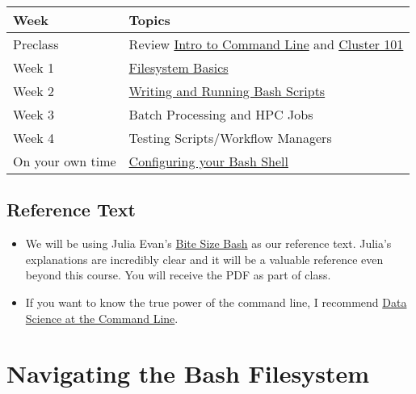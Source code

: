 \documentclass[
  letterpaper,
  DIV=11,
  numbers=noendperiod]{scrreprt}
\providecommand{\tightlist}{%
  \setlength{\itemsep}{0pt}\setlength{\parskip}{0pt}}
\begin{document}

\begin{longtable}[]{@{}
  >{\raggedright\arraybackslash}p{}
  >{\raggedright\arraybackslash}p{}@{}}
\toprule\noalign{}
\begin{minipage}[b]{\linewidth}\raggedright
Week
\end{minipage} & \begin{minipage}[b]{\linewidth}\raggedright
Topics
\end{minipage} \\
\midrule\noalign{}
\endhead
\bottomrule\noalign{}
\endlastfoot
Preclass & Review
\href{https://hutchdatascience.org/Intro_to_Command_Line/}{Intro to
Command Line} and
\href{https://hutchdatascience.org/FH_Cluster_101/}{Cluster 101} \\
Week 1 & \href{01_basics.qmd}{Filesystem Basics} \\
Week 2 & \href{02_scripting.qmd}{Writing and Running Bash Scripts} \\
Week 3 & Batch Processing and HPC Jobs \\
Week 4 & Testing Scripts/Workflow Managers \\
On your own time & \href{configuring.qmd}{Configuring your Bash
Shell} \\
\end{longtable}

\section*{Reference Text}\label{reference-text}


\begin{itemize}
\tightlist
\item
  We will be using Julia Evan's
  \href{https://wizardzines.com/zines/bite-size-bash/}{Bite Size Bash}
  as our reference text. Julia's explanations are incredibly clear and
  it will be a valuable reference even beyond this course. You will
  receive the PDF as part of class.
\item
  If you want to know the true power of the command line, I recommend
  \href{}{Data Science at the Command Line}.
\end{itemize}


\chapter{Navigating the Bash
Filesystem}\label{navigating-the-bash-filesystem}
\end{document}

